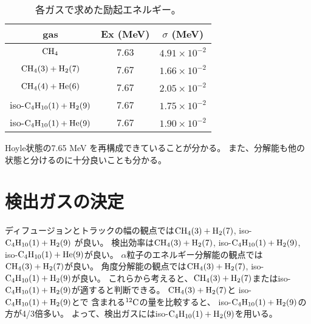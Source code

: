 \documentclass[../master]{subfiles}
\begin{document}
\begin{table}
  \centering
  \caption{各ガスで求めた励起エネルギー。}
  \label{tab::Ex_resolution}
  \begin{tabular}{ccc}
    \toprule
    gas & Ex (MeV) & $\sigma$ (MeV) \\
    \midrule
    $\rm CH_{4}$ & 7.63 & $4.91\times 10^{-2}$ \\
    $\rm CH_{4} (3) + H_{2} (7)$ & 7.67 & $1.66\times 10^{-2}$ \\
    $\rm CH_{4} (4) + He (6)$ & 7.67 & $2.05\times 10^{-2}$ \\
    iso-$\rm C_{4}H_{10} (1) + H_{2} (9)$ & 7.67 & $1.75\times 10^{-2}$ \\
    iso-$\rm C_{4}H_{10} (1) + He (9)$ & 7.67 & $1.90\times 10^{-2}$ \\
    \bottomrule
  \end{tabular}
\end{table}
Hoyle状態の7.65 MeV を再構成できていることが分かる。
また、分解能も他の状態と分けるのに十分良いことも分かる。

\section{検出ガスの決定}
ディフュージョンとトラックの幅の観点では$\rm CH_{4} (3) + H_{2} (7)$, iso-$\rm C_{4}H_{10} (1) + H_{2} (9)$ が良い。
検出効率は$\rm CH_{4} (3) + H_{2} (7)$, iso-$\rm C_{4}H_{10} (1) + H_{2} (9)$, iso-$\rm C_{4}H_{10} (1) + He (9)$が良い。
$\alpha$粒子のエネルギー分解能の観点では$\rm CH_{4} (3) + H_{2} (7)$が良い。
角度分解能の観点では$\rm CH_{4} (3) + H_{2} (7)$, iso-$\rm C_{4}H_{10} (1) + H_{2} (9)$が良い。
これらから考えると、$\rm CH_{4} (3) + H_{2} (7)$またはiso-$\rm C_{4}H_{10} (1) + H_{2} (9)$が適すると判断できる。
$\rm CH_{4} (3) + H_{2} (7)$と iso-$\rm C_{4}H_{10} (1) + H_{2} (9)$とで
含まれる${}^{12}{\rm C}$の量を比較すると、
iso-$\rm C_{4}H_{10} (1) + H_{2} (9)$の方が4/3倍多い。
よって、検出ガスにはiso-$\rm C_{4}H_{10} (1) + H_{2} (9)$を用いる。
\end{document}
